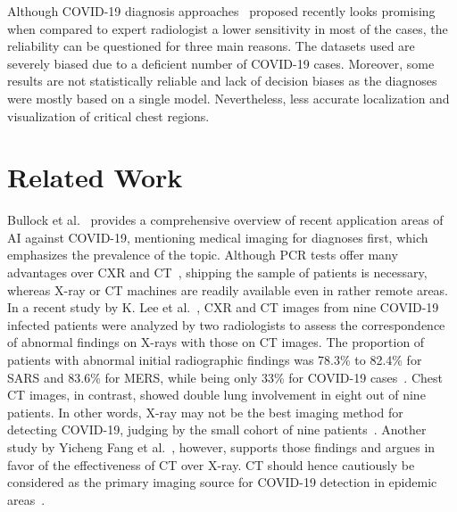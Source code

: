 \documentclass[conference]{IEEEtran}
\begin{document}
Although COVID-19 diagnosis approaches~\cite{COVID1,COVID2,narin2020automatic,wang2020covid,ozturk2020automated,karimdeepcovidexplainer,tabik2020covidgr} proposed recently looks promising when compared to expert radiologist a lower sensitivity in most of the cases, the reliability can be questioned for three main reasons. The datasets used are severely biased due to a deficient number of COVID-19 cases. Moreover, some results are not statistically reliable and lack of decision biases as the diagnoses were mostly based on a single model. Nevertheless, less accurate localization and visualization of critical chest regions.
\iffalse
\section{Related Work}
\label{sec:rw}
Bullock et al.~\cite{bullock2020mapping} provides a comprehensive overview of recent application areas of AI against COVID-19, mentioning medical imaging for diagnoses first, which emphasizes the prevalence of the topic. Although PCR tests offer many advantages over CXR and CT~\cite{COVID3}, shipping the sample of patients is necessary, whereas X-ray or CT machines are readily available even in rather remote areas. In a recent study by K. Lee et al.~\cite{COVID1}, CXR and CT images from nine COVID-19 infected patients were analyzed by two radiologists to assess the correspondence of abnormal findings on X-rays with those on CT images. The proportion of patients with abnormal initial radiographic findings was 78.3\% to 82.4\% for SARS and 83.6\% for MERS, while being only 33\% for COVID-19 cases~\cite{COVID1}. 
Chest CT images, in contrast, showed double lung involvement in eight out of nine patients. In other words, X-ray may not be the best imaging method for detecting COVID-19, judging by the small cohort of nine patients~\cite{COVID1}. Another study by Yicheng Fang et al.~\cite{COVID2}, however, supports those findings and argues in favor of the effectiveness of CT over X-ray. CT should hence cautiously be considered as the primary imaging source for COVID-19 detection in epidemic areas~\cite{COVID3}. %
\end{document}
